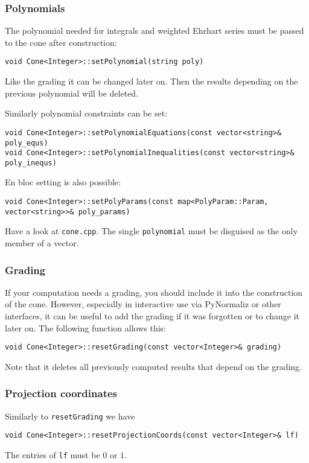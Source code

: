 \begin{small}
\subsubsection{Polynomials}

The polynomial needed for integrals and weighted Ehrhart series must be passed to the cone after construction:
\begin{Verbatim}
void Cone<Integer>::setPolynomial(string poly)
\end{Verbatim}

Like the grading it can be changed later on. Then the results depending on the previous polynomial will be deleted.

Similarly polynomial constraints can be set:
\begin{Verbatim}
void Cone<Integer>::setPolynomialEquations(const vector<string>& poly_equs)
void Cone<Integer>::setPolynomialInequalities(const vector<string>& poly_inequs)
\end{Verbatim}

En bloc setting is also possible:
\begin{Verbatim}
void Cone<Integer>::setPolyParams(const map<PolyParam::Param, vector<string>>& poly_params)
\end{Verbatim}
Have a look at \verb|cone.cpp|. The single \verb|polynomial| must be disguised as the only member of a vector.

\subsubsection{Grading}

If your computation needs a grading, you should include it into the construction of the cone. However, especially in interactive use via PyNormaliz or other interfaces, it can be useful to add the grading if it was forgotten or to change it later on. The following function allows this:

\begin{Verbatim}
void Cone<Integer>::resetGrading(const vector<Integer>& grading)
\end{Verbatim}

Note that it deletes all previously computed results that depend on the grading.

\subsubsection{Projection coordinates}

Similarly to  \verb|resetGrading| we have
\begin{Verbatim}
void Cone<Integer>::resetProjectionCoords(const vector<Integer>& lf)
\end{Verbatim}
The entries of \verb|lf| must be $0$ or $1$.


\end{small}
